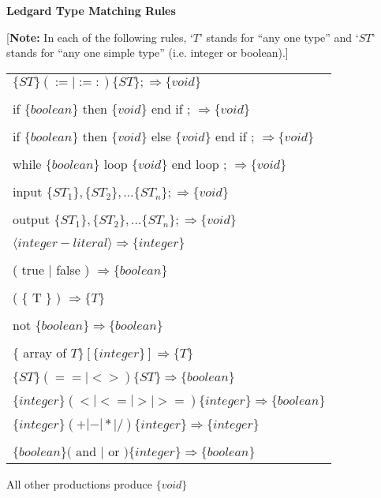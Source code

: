 \documentclass{article}
\begin{document}
{\Large\bf Ledgard Type Matching Rules}

[\textbf{Note:} In each of the following rules, `$T$' stands for ``any
one type'' and `$ST$' stands for ``any one simple type'' (i.e. integer
or boolean).]

\begin{tabular}{l}
    $\{ST\} (:= | :=:) \{ST\} ; \Rightarrow \{ void \}$\\
    \\
    if $\{ boolean \}$ then $\{ void \}$ end if ; $\Rightarrow \{void\}$\\
    \\
    if $\{boolean\}$ then $\{void\}$ else $\{void\}$ end if ; $\Rightarrow \{ void \}$\\
    \\
    while $\{boolean\}$ loop $\{void\}$ end loop ; $\Rightarrow \{void\}$ \\
    \\
    input $\{ST_1\}, \{ST_2\}, \ldots \{ST_n\} ; \Rightarrow \{void\}$ \\
    \\
    output $\{ST_1\}, \{ST_2\}, \ldots \{ST_n\} ; \Rightarrow \{void\}$ \\
    \\
    $\langle integer-literal \rangle \Rightarrow \{integer\}$\\
    \\
    ( true $|$ false ) $\Rightarrow \{boolean\}$\\
    \\
    ( \{ T \} ) $\Rightarrow \{ T \}$\\
    \\
    not $\{boolean\} \Rightarrow \{boolean\}$ \\
    \\
    $\{$ array of $T\} [ \{integer\} ] \Rightarrow \{T\}$\\
    \\
    $\{ ST \} (== | <> ) \{ST\} \Rightarrow \{boolean\}$\\
    \\
    $\{integer\} (< | <= | > | >=) \{integer\} \Rightarrow \{boolean\}$ \\
    \\
    $\{integer\} (+ | - | * | /) \{integer\} \Rightarrow \{integer\}$ \\
    \\
    $\{boolean\} ($ and $|$ or $) \{integer\} \Rightarrow \{boolean\}$ \\
\end{tabular}

All other productions produce $\{ void \}$
\end{document}
